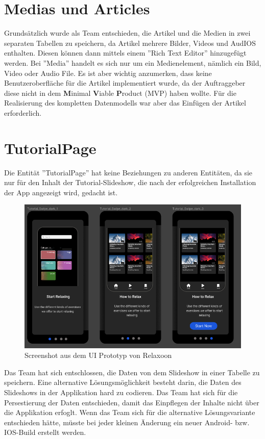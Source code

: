 \section{Medias und Articles}

Grundsätzlich wurde als Team entschieden,
die Artikel und die Medien in zwei separaten Tabellen zu speichern,
da Artikel mehrere Bilder, Videos und AudIOS enthalten.
Diesen können dann mittels einem ''Rich Text Editor'' hinzugefügt werden.
Bei ''Media'' handelt es sich nur um ein Medienelement,
nämlich ein Bild, Video oder Audio File. Es ist aber wichtig anzumerken,
dass keine Benutzeroberfläche für die Artikel implementiert wurde, da der Auftraggeber
diese nicht in dem \textbf{M}inimal \textbf{V}iable \textbf{P}roduct (MVP) haben wollte.
Für die Realisierung des kompletten Datenmodells war aber das Einfügen der Artikel erforderlich.

\section{TutorialPage}
\label{Tutorial-Page}
Die Entität ''TutorialPage'' hat keine Beziehungen zu anderen Entitäten, da sie nur für den Inhalt der Tutorial-Slideshow,
die nach der erfolgreichen Installation der App angezeigt wird, gedacht ist.

\begin{figure}[H]
  \centering
  \includegraphics[height=0.5\textwidth]{./pics/slideshow.png}
  \caption{Screenshot aus dem UI Prototyp von Relaxoon}
\end{figure}

Das Team hat sich entschlossen, die Daten von dem Slideshow in einer Tabelle zu speichern.
Eine alternative Lösungsmöglichkeit besteht darin, die Daten des Slideshows in der Applikation hard zu codieren.
Das Team hat sich für die Persestierung der Daten entschieden, damit das Einpflegen der Inhalte nicht über die Applikation erfoglt.
Wenn das Team sich für die alternative Lösungsvariante entschieden hätte, müsste bei jeder kleinen Änderung ein neuer Android- bzw. IOS-Build erstellt werden.

